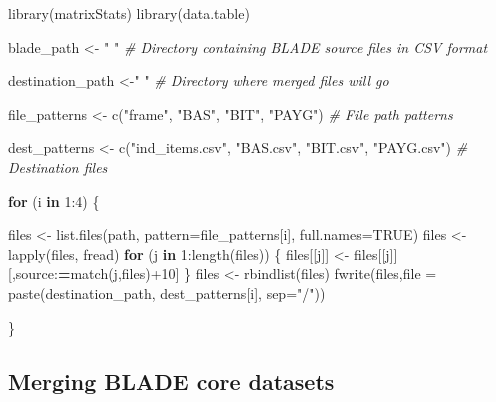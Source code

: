 \documentclass[
]{book}
\newenvironment{Shaded}{\begin{snugshade}}{\end{snugshade}}
\newcommand{\AttributeTok}[1]{\textcolor[rgb]{0.77,0.63,0.00}{#1}}
\newcommand{\CommentTok}[1]{\textcolor[rgb]{0.56,0.35,0.01}{\textit{#1}}}
\newcommand{\ConstantTok}[1]{\textcolor[rgb]{0.00,0.00,0.00}{#1}}
\newcommand{\ControlFlowTok}[1]{\textcolor[rgb]{0.13,0.29,0.53}{\textbf{#1}}}
\newcommand{\DecValTok}[1]{\textcolor[rgb]{0.00,0.00,0.81}{#1}}
\newcommand{\ErrorTok}[1]{\textcolor[rgb]{0.64,0.00,0.00}{\textbf{#1}}}
\newcommand{\FunctionTok}[1]{\textcolor[rgb]{0.00,0.00,0.00}{#1}}
\newcommand{\NormalTok}[1]{#1}
\newcommand{\OtherTok}[1]{\textcolor[rgb]{0.56,0.35,0.01}{#1}}
\newcommand{\SpecialCharTok}[1]{\textcolor[rgb]{0.00,0.00,0.00}{#1}}
\newcommand{\StringTok}[1]{\textcolor[rgb]{0.31,0.60,0.02}{#1}}
\begin{document}
\begin{Shaded}
\begin{Highlighting}[]
\FunctionTok{library}\NormalTok{(matrixStats)}
\FunctionTok{library}\NormalTok{(data.table)}

\NormalTok{blade\_path }\OtherTok{\textless{}{-}} \StringTok{" "} \CommentTok{\# Directory containing BLADE source files in CSV format}

\NormalTok{destination\_path }\OtherTok{\textless{}{-}}\StringTok{"  "} \CommentTok{\# Directory where merged files will go}

\NormalTok{file\_patterns }\OtherTok{\textless{}{-}} \FunctionTok{c}\NormalTok{(}\StringTok{"frame"}\NormalTok{, }\StringTok{"BAS"}\NormalTok{, }\StringTok{"BIT"}\NormalTok{, }\StringTok{"PAYG"}\NormalTok{) }\CommentTok{\# File path patterns}

\NormalTok{dest\_patterns }\OtherTok{\textless{}{-}} \FunctionTok{c}\NormalTok{(}\StringTok{"ind\_items.csv"}\NormalTok{, }\StringTok{"BAS.csv"}\NormalTok{, }\StringTok{"BIT.csv"}\NormalTok{, }\StringTok{"PAYG.csv"}\NormalTok{) }\CommentTok{\# Destination files}

\ControlFlowTok{for}\NormalTok{ (i }\ControlFlowTok{in} \DecValTok{1}\SpecialCharTok{:}\DecValTok{4}\NormalTok{) \{}

\NormalTok{    files }\OtherTok{\textless{}{-}} \FunctionTok{list.files}\NormalTok{(path, }\AttributeTok{pattern=}\NormalTok{file\_patterns[i], }\AttributeTok{full.names=}\ConstantTok{TRUE}\NormalTok{)}
\NormalTok{    files }\OtherTok{\textless{}{-}} \FunctionTok{lapply}\NormalTok{(files, fread)}
    \ControlFlowTok{for}\NormalTok{ (j }\ControlFlowTok{in} \DecValTok{1}\SpecialCharTok{:}\FunctionTok{length}\NormalTok{(files)) \{}
\NormalTok{        files[[j]] }\OtherTok{\textless{}{-}}\NormalTok{ files[[j]][,source}\SpecialCharTok{:}\ErrorTok{=}\FunctionTok{match}\NormalTok{(j,files)}\SpecialCharTok{+}\DecValTok{10}\NormalTok{]}
\NormalTok{    \}}
\NormalTok{    files }\OtherTok{\textless{}{-}} \FunctionTok{rbindlist}\NormalTok{(files)}
    \FunctionTok{fwrite}\NormalTok{(files,}\AttributeTok{file =} \FunctionTok{paste}\NormalTok{(destination\_path, dest\_patterns[i], }\AttributeTok{sep=}\StringTok{"/"}\NormalTok{))}

\NormalTok{\}}
\end{Highlighting}
\end{Shaded}

\hypertarget{merging-blade-core-datasets}{%
\subsection{Merging BLADE core datasets}\label{merging-blade-core-datasets}}
\end{document}
